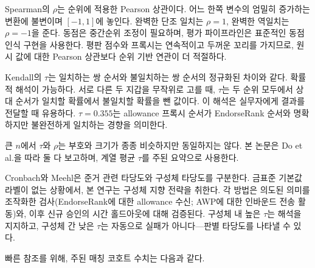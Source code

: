 
Spearman의 $\rho$는 순위에 적용한 Pearson 상관이다. 어느 한쪽 변수의 엄밀히 증가하는 변환에 불변이며 $[-1,1]$에 놓인다. 완벽한 단조 일치는 $\rho=1$, 완벽한 역일치는 $\rho=-1$을 준다. 동점은 중간순위 조정이 필요하며, 평가 파이프라인은 표준적인 동점 인식 구현을 사용한다. 평판 점수와 프록시는 연속적이고 두꺼운 꼬리를 가지므로, 원시 값에 대한 Pearson 상관보다 순위 기반 연관이 더 적절하다\citep{16}.


Kendall의 $\tau$는 일치하는 쌍 순서와 불일치하는 쌍 순서의 정규화된 차이와 같다. 확률적 해석이 가능하다. 서로 다른 두 지갑을 무작위로 고를 때, $\tau$는 두 순위 모두에서 상대 순서가 일치할 확률에서 불일치할 확률을 뺀 값이다\citep{36}. 이 해석은 실무자에게 결과를 전달할 때 유용하다. $\tau=0.355$는 allowance 프록시 순서가 EndorseRank 순서와 명확하지만 불완전하게 일치하는 경향을 의미한다.

큰 $n$에서 $\tau$와 $\rho$는 부호와 크기가 종종 비슷하지만 동일하지는 않다. 본 논문은 Do et al.\citep{16}을 따라 둘 다 보고하며, 계열 평균 $\tau$를 주된 요약으로 사용한다.


Cronbach와 Meehl은 준거 관련 타당도와 구성체 타당도를 구분한다. 금표준 기본값 라벨이 없는 상황에서, 본 연구는 구성체 지향 전략을 취한다. 각 방법은 의도된 의미를 조작화한 검사(EndorseRank에 대한 allowance 수신; AWP에 대한 인바운드 전송 활동)와, 이후 신규 승인의 시간 홀드아웃에 대해 검증된다. 구성체 내 높은 $\tau$는 해석을 지지하고, 구성체 간 낮은 $\tau$는 자동으로 실패가 아니다---판별 타당도를 나타낼 수 있다.


빠른 참조를 위해, 주된 매칭 코호트 수치는 다음과 같다.

